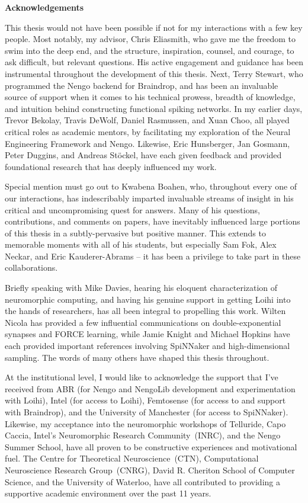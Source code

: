 {}
\begin{center}\textbf{Acknowledgements}\end{center}

This thesis would not have been possible if not for my interactions with a few key people.
Most notably, my advisor, Chris Eliasmith, who gave me the freedom to swim into the deep end, and the structure, inspiration, counsel, and courage, to ask difficult, but relevant questions.
His active engagement and guidance has been instrumental throughout the development of this thesis.
Next, Terry Stewart, who programmed the Nengo backend for Braindrop, and has been an invaluable source of support when it comes to his technical prowess, breadth of knowledge, and intuition behind constructing functional spiking networks.
In my earlier days, Trevor Bekolay, Travis DeWolf, Daniel Rasmussen, and Xuan Choo, all played critical roles as academic mentors, by facilitating my exploration of the Neural Engineering Framework and Nengo.
Likewise, Eric Hunsberger, Jan Gosmann, Peter Duggins, and Andreas St{\"o}ckel, have each given feedback and provided foundational research that has deeply influenced my work.

Special mention must go out to Kwabena Boahen, who, throughout every one of our interactions, has indescribably imparted invaluable streams of insight in his critical and uncompromising quest for answers.
Many of his questions, contributions, and comments on papers, have inevitably influenced large portions of this thesis in a subtly-pervasive but positive manner.
This extends to memorable moments with all of his students, but especially Sam Fok, Alex Neckar, and Eric Kauderer-Abrams -- it has been a privilege to take part in these collaborations.

Briefly speaking with Mike Davies, hearing his eloquent characterization of neuromorphic computing, and having his genuine support in getting Loihi into the hands of researchers, has all been integral to propelling this work.
Wilten Nicola has provided a few influential communications on double-exponential synapses and FORCE learning, while Jamie Knight and Michael Hopkins have each provided important references involving SpiNNaker and high-dimensional sampling.
The words of many others have shaped this thesis throughout.

At the institutional level, I would like to acknowledge the support that I've received from
ABR (for Nengo and NengoLib development and experimentation with Loihi),
Intel (for access to Loihi),
Femtosense (for access to and support with Braindrop),
and the University of Manchester (for access to SpiNNaker).
Likewise, my acceptance into the neuromorphic workshops of Telluride, Capo Caccia, Intel's Neuromorphic Research Community~(INRC), and the Nengo Summer School, have all proven to be constructive experiences and motivational fuel.
The Centre for Theoretical Neuroscience~(CTN), Computational Neuroscience Research Group~(CNRG), David R. Cheriton School of Computer Science, and the University of Waterloo, have all contributed to providing a supportive academic environment over the past 11 years.  

